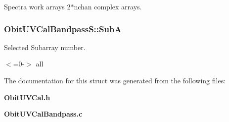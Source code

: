 Spectra work arrays 2$\ast$nchan complex arrays. 

\subsubsection{ {\bf Obit\-UVCal\-Bandpass\-S::Sub\-A}}\label{structObitUVCalBandpassS_o7}


Selected Subarray number. 

$<$=0-$>$ all 

The documentation for this struct was generated from the following files:\begin{CompactItemize}
\item 
{\bf Obit\-UVCal.h}\item 
{\bf Obit\-UVCal\-Bandpass.c}\end{CompactItemize}
